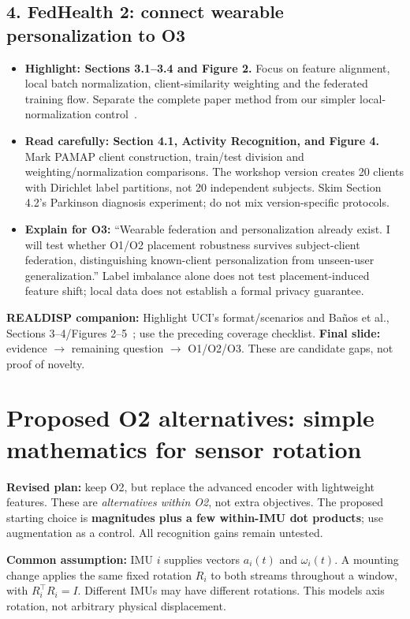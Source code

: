 \documentclass[10pt]{article}
\begin{document}
\subsection*{4. FedHealth 2: connect wearable personalization to O3}
\begin{itemize}
\item \textbf{Highlight: Sections 3.1--3.4 and Figure 2.} Focus on feature alignment, local batch normalization, client-similarity weighting and the federated training flow. Separate the complete paper method from our simpler local-normalization control~\cite{omfedhealth}.
\item \textbf{Read carefully: Section 4.1, Activity Recognition, and Figure 4.} Mark PAMAP client construction, train/test division and weighting/normalization comparisons. The workshop version creates 20 clients with Dirichlet label partitions, not 20 independent subjects. Skim Section 4.2's Parkinson diagnosis experiment; do not mix version-specific protocols.
\item \textbf{Explain for O3:} ``Wearable federation and personalization already exist. I will test whether O1/O2 placement robustness survives subject-client federation, distinguishing known-client personalization from unseen-user generalization.'' Label imbalance alone does not test placement-induced feature shift; local data does not establish a formal privacy guarantee.
\end{itemize}

\textbf{REALDISP companion:} Highlight UCI's format/scenarios and Ba\~nos et al., Sections 3--4/Figures 2--5~\cite{omrealdisp,ombanos}; use the preceding coverage checklist. \textbf{Final slide:} evidence $\rightarrow$ remaining question $\rightarrow$ O1/O2/O3. These are candidate gaps, not proof of novelty.
\endgroup

\clearpage
\begingroup
{}
\section*{Proposed O2 alternatives: simple mathematics for sensor rotation}
\textbf{Revised plan:} keep O2, but replace the advanced encoder with lightweight features. These are \emph{alternatives within O2}, not extra objectives. The proposed starting choice is \textbf{magnitudes plus a few within-IMU dot products}; use augmentation as a control. All recognition gains remain untested.

\textbf{Common assumption:} IMU $i$ supplies vectors $a_i(t)$ and $\omega_i(t)$. A mounting change applies the same fixed rotation $R_i$ to both streams throughout a window, with $R_i^{\top}R_i=I$. Different IMUs may have different rotations. This models axis rotation, not arbitrary physical displacement.
\end{document}
